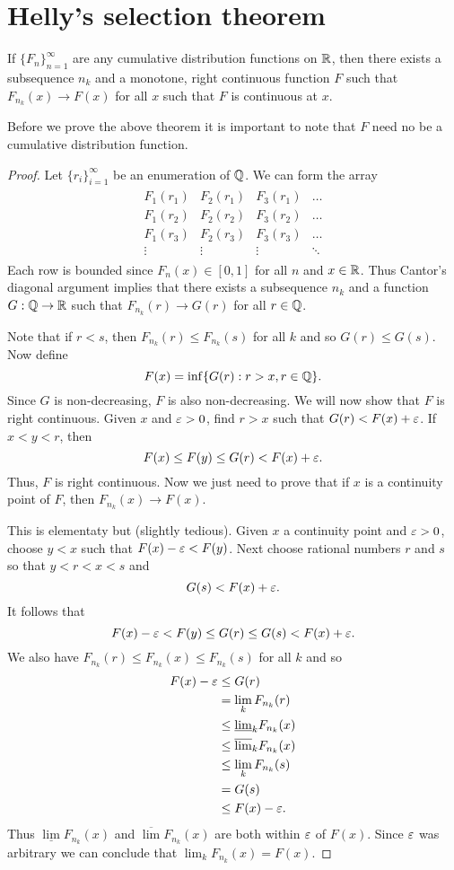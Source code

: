 \section{Helly's selection theorem}
\begin{thrm}
    If $\{F_n\}_{n=1}^\infty$ are any cumulative distribution functions on ${\mathbb R}$, then there exists a subsequence $n_k$ and a monotone, right continuous function $F$ such that $F_{n_k}(x) \to F(x)$ for all $x$ such that $F$ is continuous at $x$.
\end{thrm}
Before we prove the above theorem it is important to note that $F$ need no be a cumulative distribution function.
\begin{proof}
    Let $\{r_i\}_{i=1}^\infty$ be an enumeration of ${\mathbb{Q}}$. We can form the array
    \begin{align*}
        \begin{matrix}
            F_1(r_1)&F_2(r_1)&F_3(r_1)&\ldots\\
            F_1(r_2)&F_2(r_2)&F_3(r_2)&\ldots\\
            F_1(r_3)&F_2(r_3)&F_3(r_3)&\ldots\\
            \vdots&\vdots&\vdots&\ddots
        \end{matrix}
    \end{align*}
    Each row is bounded since $F_n(x) \in [0,1]$ for all $n$ and $x \in {\mathbb R}$. Thus Cantor's diagonal argument implies that there exists a subsequence $n_k$ and a function $G : {\mathbb{Q}} \to {\mathbb R}$ such that $F_{n_k}(r) \to G(r)$ for all $r \in {\mathbb{Q}}$.

    Note that if $r<s$, then $F_{n_k}(r) \le F_{n_k}(s)$ for all $k$ and so $G(r)\le G(s)$. Now define
    \[F(x)=\inf\{G(r): r>x, r\in {\mathbb{Q}}\}.\]
    Since $G$ is non-decreasing, $F$ is also non-decreasing. We will now show that $F$ is right continuous. Given $x$ and $\varepsilon > 0$, find $r > x$ such that $G(r) < F(x)+\varepsilon$. If $x < y < r$, then 
    \[F(x) \le F(y) \le G(r) < F(x)+\varepsilon.\]
    Thus, $F$ is right continuous. Now we just need to prove that if $x$ is a continuity point of $F$, then $F_{n_k}(x) \to F(x)$.

    This is elementaty but (slightly tedious). Given $x$ a continuity point and $\varepsilon > 0$, choose $y < x$ such that $F(x)-\varepsilon < F(y)$. Next choose rational numbers $r$ and $s$ so that $y < r< x< s$ and
    \[G(s) < F(x)+\varepsilon. \]
    It follows that 
    \[F(x)-\varepsilon < F(y)\le G(r) \le G(s) < F(x)+\varepsilon. \]
    We also have $F_{n_k}(r) \le F_{n_k}(x)\le F_{n_k}(s)$ for all $k$ and so
    \begin{align*}
        F(x)-\varepsilon&\le G(r)\\
         &=\lim_k F_{n_k}(r)\\
        &\le \underline{\lim}_k F_{n_k}(x)\\
        & \le \overline{\lim}_k F_{n_k}(x)\\
        & \le \lim_k F_{n_k}(s)\\
        &= G(s)\\
        &\le F(x)-\varepsilon.
    \end{align*}
    Thus $\underline{\lim}F_{n_k}(x)$ and $\overline{\lim}F_{n_k}(x)$ are both within $\varepsilon$ of $F(x)$. Since $\varepsilon$ was arbitrary we can conclude that $\lim_k F_{n_k}(x)=F(x)$.
\end{proof}
